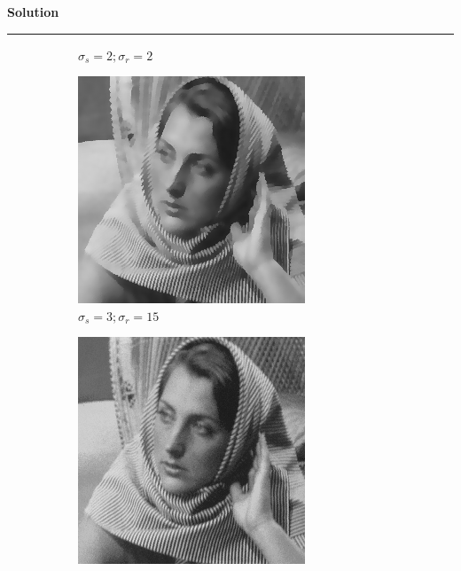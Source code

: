 \documentclass[a4paper,12pt]{article}
\newenvironment{solution}[2][]{%
    \begin{mdframed}[linecolor=green!60!black, linewidth=2pt, roundcorner=10pt, backgroundcolor=green!5!white, skipabove=12pt, skipbelow=12pt]%
        \textbf{\large #2} %
        \par\noindent\rule{\textwidth}{0.4pt} %
        \vspace{0.5em} %
}{%
    \end{mdframed}%
}
\begin{document}
\begin{solution}{Solution}
\begin{figure}[H]
\begin{subfigure}[b]{0.24\textwidth}
        \caption{$\sigma_s=2;\sigma_r=2$}
        \label{fig:subfig2}
    \end{subfigure}
    \begin{subfigure}[b]{0.24\textwidth}
        \centering
        \includegraphics[width=\textwidth]{../images/filtered_barbara256_meanshift_sigma_s_3_sigma_r_15.png}
        \caption{$\sigma_s=3;\sigma_r=15$}
        \label{fig:subfig3}
    \end{subfigure}
    \begin{subfigure}[b]{0.24\textwidth}
        \centering
        \includegraphics[width=\textwidth]{../images/filtered_barbara256_meanshift_sigma_s_15_sigma_r_3.png}

\end{subfigure}
\end{figure}
\end{solution}
\end{document}
